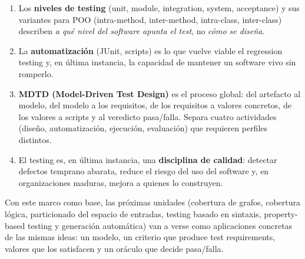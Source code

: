 \documentclass[12pt,a4paper]{article}
\begin{document}
\begin{enumerate}
  \item Los \textbf{niveles de testing} (unit, module, integration, system, acceptance) y sus variantes para POO (intra-method, inter-method, intra-class, inter-class) describen \textit{a qué nivel del software apunta el test}, no \textit{cómo se diseña}.
  \item La \textbf{automatización} (JUnit, scripts) es lo que vuelve viable el regression testing y, en última instancia, la capacidad de mantener un software vivo sin romperlo.
  \item \textbf{MDTD (Model-Driven Test Design)} es el proceso global: del artefacto al modelo, del modelo a los requisitos, de los requisitos a valores concretos, de los valores a scripts y al veredicto pasa/falla. Separa cuatro actividades (diseño, automatización, ejecución, evaluación) que requieren perfiles distintos.
  \item El testing es, en última instancia, una \textbf{disciplina de calidad}: detectar defectos temprano abarata, reduce el riesgo del uso del software y, en organizaciones maduras, mejora a quienes lo construyen.
\end{enumerate}

Con este marco como base, las próximas unidades (cobertura de grafos, cobertura lógica, particionado del espacio de entradas, testing basado en sintaxis, property-based testing y generación automática) van a verse como aplicaciones concretas de las mismas ideas: un modelo, un criterio que produce test requirements, valores que los satisfacen y un oráculo que decide pasa/falla.
\end{document}
